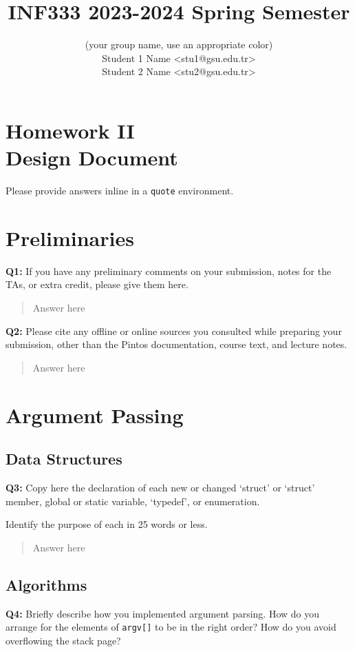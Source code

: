 \documentclass[a4paper,11pt]{paper}
\title{INF333 2023-2024 Spring Semester}
\author{
\textbf{\color{blue}{Şirinler}} {\small(your group name, use an appropriate color)}
\\ Student 1 Name <stu1@gsu.edu.tr>
\\ Student 2 Name <stu2@gsu.edu.tr>}
\begin{document}
\maketitle

\section*{\LARGE Homework II \\
  Design Document}

Please provide answers inline in a \texttt{quote} environment.


\section{Preliminaries}

\textbf{Q1:} If you have any preliminary comments on your submission, notes for the TAs, or extra credit, please give them here.
\begin{quote}
  Answer here
\end{quote}


\textbf{Q2:} Please cite any offline or online sources you consulted while preparing your
submission, other than the Pintos documentation, course text, and lecture notes.
\begin{quote}
  Answer here
\end{quote}


\section{Argument Passing}

\subsection{Data Structures}

\textbf{Q3:} Copy here the declaration of each new or changed `struct' or `struct' member, global or static variable, `typedef', or enumeration.

Identify the purpose of each in 25 words or less.
\begin{quote}
  Answer here
\end{quote}


\subsection{Algorithms}


\textbf{Q4:} Briefly describe how you implemented argument parsing.  How do you arrange for the elements of \texttt{argv[]} to be in the right order? How do you avoid overflowing the stack page?
\end{document}
